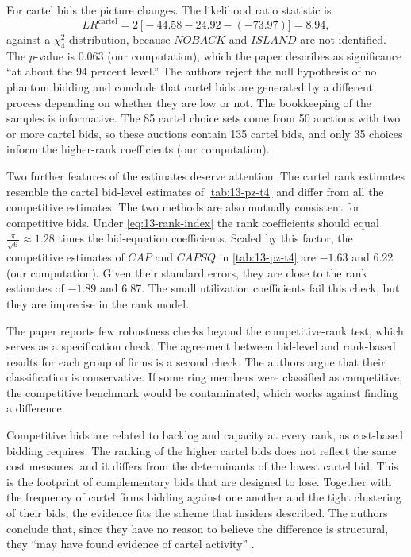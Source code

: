 For cartel bids the picture changes. The likelihood ratio statistic is
\begin{equation*}
  LR^{\mathrm{cartel}} = 2\,\bigl[-44.58 - 24.92 - (-73.97)\bigr] = 8.94 ,
\end{equation*}
against a $\chi^2_4$ distribution, because $\mathit{NOBACK}$ and $\mathit{ISLAND}$ are not identified. The $p$-value
is 0.063 (our computation), which the paper describes as significance ``at about the 94 percent level.'' The authors
reject the null hypothesis of no phantom bidding and conclude that cartel bids are generated by a different process
depending on whether they are low or not. The bookkeeping of the samples is informative. The 85 cartel choice sets
come from 50 auctions with two or more cartel bids, so these auctions contain 135 cartel bids, and only 35 choices
inform the higher-rank coefficients (our computation).

Two further features of the estimates deserve attention. The cartel rank estimates resemble the cartel bid-level
estimates of \cref{tab:13-pz-t4} and differ from all the competitive estimates. The two methods are also mutually
consistent for competitive bids. Under \eqref{eq:13-rank-index} the rank coefficients should equal
$\frac{\pi}{\sqrt6} \approx 1.28$ times the bid-equation coefficients. Scaled by this factor, the
competitive estimates of $\mathit{CAP}$ and $\mathit{CAPSQ}$ in \cref{tab:13-pz-t4} are $-1.63$ and 6.22 (our
computation). Given their standard errors, they are close to the rank estimates of $-1.89$ and 6.87. The small
utilization coefficients fail this check, but they are imprecise in the rank model.

The paper reports few robustness checks beyond the competitive-rank test, which serves as a specification check.
The agreement between bid-level and rank-based results for each group of firms is a second check. The authors argue
that their classification is conservative. If some ring members were classified as competitive, the competitive
benchmark would be contaminated, which works against finding a difference.

Competitive bids are related to backlog and capacity at every rank, as cost-based bidding requires. The ranking of
the higher cartel bids does not reflect the same cost measures, and it differs from the determinants of the lowest
cartel bid. This is the footprint of complementary bids that are designed to lose. Together with the frequency of
cartel firms bidding against one another and the tight clustering of their bids, the evidence fits the scheme that
insiders described. The authors conclude that, since they have no reason to believe the difference is structural,
they ``may have found evidence of cartel activity'' \citep[p.~36]{PorterZona1993}.

